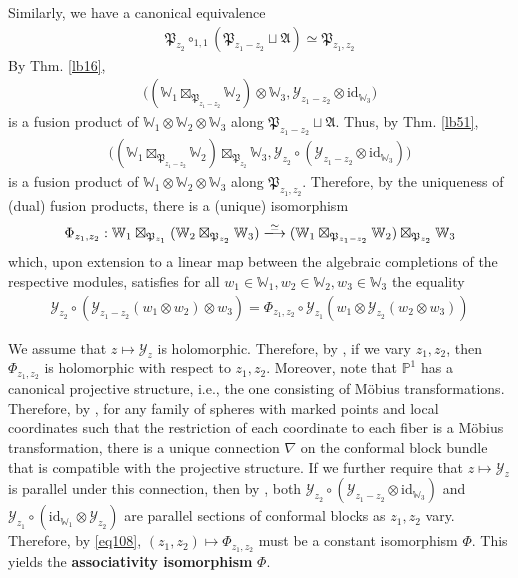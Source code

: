 \documentclass[11pt,b5paper,notitlepage]{article}
\theoremstyle{definition}
\theoremstyle{plain}
\newcommand{\fk}{\mathfrak}
\newcommand{\mc}{\mathcal}
\newcommand{\Wbb}{\mathbb W}
\newcommand{\Pbb}{\mathbb P}
\newcommand{\<}{\left\langle}
\renewcommand{\>}{\right\rangle}
\newcommand{\id}{\mathrm{id}}
\newcommand{\fp}{\mathfrak{P}}
\numberwithin{equation}{section}
\begin{document}
Similarly, we have a canonical equivalence
\begin{gather*}
\fp_{z_2}\circ_{1,1}(\fp_{z_1-z_2}\sqcup\fk A)\simeq\fp_{z_1,z_2}
\end{gather*}
By Thm. \ref{lb16},
\begin{align*}
\big((\Wbb_1\boxtimes_{\fp_{z_1-z_2}}\Wbb_2)\otimes\Wbb_3,\mc Y_{z_1-z_2}\otimes\id_{\Wbb_3}\big)
\end{align*}
is a  fusion product of $\Wbb_1\otimes\Wbb_2\otimes\Wbb_3$ along $\fp_{z_1-z_2}\sqcup\fk A$. Thus, by Thm. \ref{lb51},
\begin{align*}
\big((\Wbb_1\boxtimes_{\fp_{z_1-z_2}}\Wbb_2)\boxtimes_{\fp_{z_2}}\Wbb_3,\mc Y_{z_2}\circ(\mc Y_{z_1-z_2}\otimes\id_{\Wbb_3})\big)
\end{align*}
is a  fusion product of $\Wbb_1\otimes\Wbb_2\otimes\Wbb_3$ along $\fp_{z_1,z_2}$. Therefore, by the uniqueness of (dual) fusion products, there is a (unique) isomorphism 
\begin{gather*}
\Phi_{z_1,z_2}:\Wbb_1\boxtimes_{\fp_{z_1}}(\Wbb_2\boxtimes_{\fp_{z_2}}\Wbb_3)\xlongrightarrow{\simeq}  (\Wbb_1\boxtimes_{\fp_{z_1-z_2}}\Wbb_2)\boxtimes_{\fp_{z_2}}\Wbb_3
\end{gather*}
which, upon extension to a linear map between the algebraic completions of the respective modules, satisfies for all $w_1\in\Wbb_1,w_2\in\Wbb_2,w_3\in\Wbb_3$ the equality
\begin{gather}
\mc Y_{z_2}\circ(\mc Y_{z_1-z_2}(w_1\otimes w_2)\otimes w_3)=\Phi_{z_1,z_2}\circ \mc Y_{z_1}(w_1\otimes\mc Y_{z_2}(w_2\otimes w_3))\label{eq108}
\end{gather}


We assume that $z\mapsto\mc Y_z$ is holomorphic. Therefore, by \cite[Prop. 3.20]{GZ2}, if we vary $z_1,z_2$, then $\Phi_{z_1,z_2}$ is holomorphic with respect to $z_1,z_2$. Moreover, note that $\Pbb^1$ has a canonical projective structure, i.e., the one consisting of M\"obius transformations. Therefore, by \cite[Cor. 2.32]{GZ2}, for any family of spheres with marked points and local coordinates such that the restriction of each coordinate to each fiber is a M\"obius transformation, there is a unique connection $\nabla$ on the conformal block bundle that is compatible with the projective structure. If we further require that $z\mapsto\mc Y_z$ is parallel under this connection, then by \cite[Thm. 4.11]{GZ2}, both $\mc Y_{z_2}\circ(\mc Y_{z_1-z_2}\otimes\id_{\Wbb_3})$ and $\mc Y_{z_1}\circ(\id_{\Wbb_1}\otimes\mc Y_{z_2})$ are parallel sections of conformal blocks as $z_1,z_2$ vary. Therefore, by \eqref{eq108}, $(z_1,z_2)\mapsto\Phi_{z_1,z_2}$ must be a constant isomorphism $\Phi$. This yields the \textbf{associativity isomorphism} $\Phi$.
\end{document}
